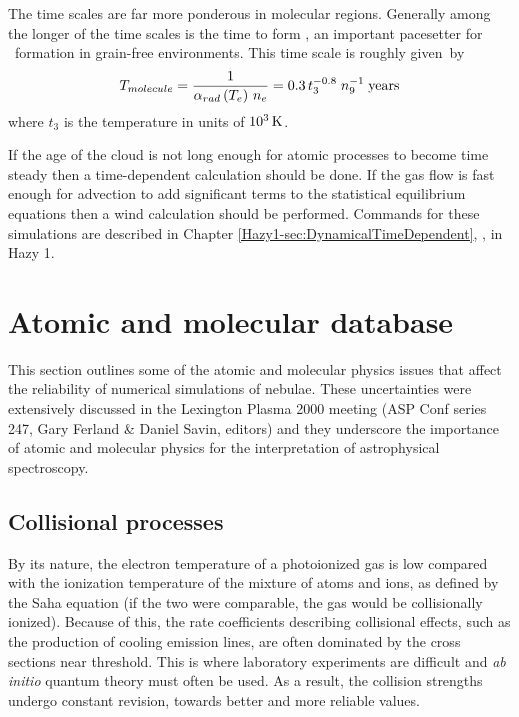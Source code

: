 The time scales are far more ponderous in molecular regions.
Generally
among the longer of the time scales is the time to form \hminus,
an important
pacesetter for \htwo\ formation in grain-free environments.
This time scale is roughly given~by
\begin{equation}
T_{molecule}  = {1 \over {\alpha _{rad} \left( {T_e } \right)\,n_e }} =
0.3\,t_3^{ - 0.8} \;n_9^{ - 1} \;{\mathrm{years}}%
\end{equation}
where $t_3$ is the temperature in units of $10^3 {\rm\thinspace K}$.

If the age of the cloud is not long enough for atomic processes
to become time steady then a time-dependent calculation should
be done.
If the gas flow is fast enough for advection to add significant
terms to the statistical equilibrium equations then a wind 
calculation should be performed.
Commands for these simulations are described in Chapter
\ref{Hazy1-sec:DynamicalTimeDependent},
,
in Hazy 1.

\section{Atomic and molecular database}

This section outlines some of the atomic and molecular physics issues
that affect the reliability of numerical simulations of nebulae.
These
uncertainties were extensively discussed in the
Lexington Plasma 2000 meeting
(ASP Conf series 247,
Gary Ferland \& Daniel Savin, editors) and they underscore the importance
of atomic and molecular physics for the interpretation of astrophysical
spectroscopy.

\subsection{Collisional processes}

By its nature, the electron temperature of a photoionized gas is low
compared with the ionization temperature of the mixture of atoms and ions,
as defined by the Saha equation (if the two were comparable, the gas would
be collisionally ionized).
Because of this, the rate coefficients describing
collisional effects, such as the production of cooling emission lines, are
often dominated by the cross sections near threshold.  This is where
laboratory experiments are difficult and \emph{ab initio} quantum theory
must often be used.
As a result, the collision strengths undergo constant revision,
towards better and more reliable values.

